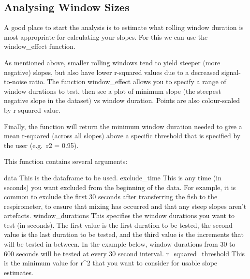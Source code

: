 \documentclass[
]{article}
\begin{document}
\subsection{Analysing Window Sizes}\label{analysing-window-sizes}

A good place to start the analysis is to estimate what rolling window
duration is most appropriate for calculating your slopes. For this we
can use the window\_effect function.

As mentioned above, smaller rolling windows tend to yield steeper (more
negative) slopes, but also have lower r-squared values due to a
decreased signal-to-noise ratio. The function window\_effect allows you
to specify a range of window durations to test, then see a plot of
minimum slope (the steepest negative slope in the dataset) vs window
duration. Points are also colour-scaled by r-squared value.

Finally, the function will return the minimum window duration needed to
give a mean r-squared (across all slopes) above a specific threshold
that is specified by the user (e.g.~r2 = 0.95).

This function contains several arguments:

data This is the dataframe to be used. exclude\_time This is any time
(in seconds) you want excluded from the beginning of the data. For
example, it is common to exclude the first 30 seconds after transferring
the fish to the respirometer, to ensure that mixing has occurred and
that any steep slopes aren't artefacts. window\_durations This specifies
the window durations you want to test (in seconds). The first value is
the first duration to be tested, the second value is the last duration
to be tested, and the third value is the increments that will be tested
in between. In the example below, window durations from 30 to 600
seconds will be tested at every 30 second interval.
r\_squared\_threshold This is the minimum value for r\^{}2 that you want
to consider for usable slope estimates.
\end{document}

